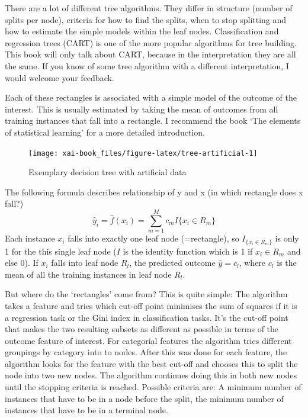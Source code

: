 \documentclass[12pt,]{krantz}
\theoremstyle{definition}
\theoremstyle{definition}
\theoremstyle{definition}
\theoremstyle{remark}
\begin{document}
There are a lot of different tree algorithms. They differ in structure
(number of splits per node), criteria for how to find the splits, when
to stop splitting and how to estimate the simple models within the leaf
nodes. Classification and regression trees (CART) is one of the more
popular algorithms for tree building. This book will only talk about
CART, because in the interpretation they are all the same. If you know
of some tree algorithm with a different interpretation, I would welcome
your feedback.

Each of these rectangles is associated with a simple model of the
outcome of the interest. This is usually estimated by taking the mean of
outcomes from all training instances that fall into a rectangle. I
recommend the book `The elements of statistical learning'
\citep{Hastie2009} for a more detailed introduction.

\begin{figure}
\texttt{[image: xai-book\_files/figure-latex/tree-artificial-1]} \caption{Exemplary decision tree with artificial data}\label{fig:tree-artificial}
\end{figure}

The following formula describes relationship of y and x (in which
rectangle does x fall?)
\[\hat{y}_i = \hat{f}(x_i) = \sum_{m = 1}^M c_m I\{x_i \in R_m\}\] Each
instance \(x_i\) falls into exactly one leaf node (=rectangle), so
\(I_{\{x_i \in R_m\}}\) is only 1 for the this single leaf node (\(I\)
is the identity function which is 1 if \(x_i \in R_m\) and else 0). If
\(x_i\) falls into leaf node \(R_l\), the predicted outcome
\(\hat{y} = c_l\), where \(c_l\) is the mean of all the training
instances in leaf node \(R_l\).

But where do the `rectangles' come from? This is quite simple: The
algorithm takes a feature and tries which cut-off point minimises the
sum of squares if it is a regression task or the Gini index in
classification tasks. It's the cut-off point that makes the two
resulting subsets as different as possible in terms of the outcome
feature of interest. For categorial features the algorithm tries
different groupings by category into to nodes. After this was done for
each feature, the algorithm looks for the feature with the best cut-off
and chooses this to split the node into two new nodes. The algorithm
continues doing this in both new nodes until the stopping criteria is
reached. Possible criteria are: A minimum number of instances that have
to be in a node before the split, the minimum number of instances that
have to be in a terminal node.
\end{document}
